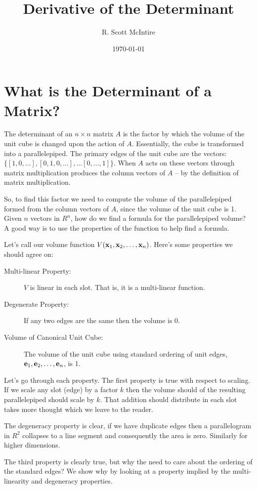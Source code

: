 \documentclass{article}
\title{Derivative of the Determinant}
\author{R. Scott McIntire}
\date{\today}
\begin{document}
\maketitle

\section{What is the Determinant of a Matrix?}
The determinant of an $n\times n$ matrix $A$ is the factor by which the volume of
the unit cube is changed upon the action of $A$. Essentially, the cube is
transformed into a parallelepiped. The primary edges of the unit cube are the
vectors: $\{ [1, 0, \ldots], [0, 1, 0, \ldots], \ldots [0, \dots, 1]\}$.
When $A$ acts on these vectors through matrix multiplication
produces the column vectors of $A$ -- by the definition of matrix multiplication.

So, to find this factor we need to compute the volume of the parallelepiped formed
from the column vectors of $A$, since the volume of the unit cube is 1.
Given $n$ vectors in $R^n$, how do we find a formula for the parallelepiped volume?
A good way is to use the properties of the function to help find a formula.

Let's call our volume function $V({\bf x}_1, {\bf x}_2, \ldots, {\bf x}_n)$.
Here's some properties we should agree on:
\begin{description}
\item[Multi-linear Property:]{$V$ is linear in each slot. That is,
    it is a multi-linear function.}
\item[Degenerate Property:]{If any two edges are the same then the volume is $0$.}
\item[Volume of Canonical Unit Cube:]{The volume of the unit cube using
    standard ordering of unit edges, ${\bf e}_1, {\bf e}_2, \ldots , {\bf e}_n$, is 1.}
\end{description}
Let's go through each property.
The first property is true with respect to scaling. If we scale any slot
(edge) by a factor
$k$ then the volume should of the resulting parallelepiped should scale by $k$.
That addition should distribute in each slot takes more thought which we leave
to the reader.

The degeneracy property is clear, if we have duplicate edges then a parallelogram
in $R^2$ collapses to a line segment and consequently the area is zero. Similarly
for higher dimensions.

The third property is clearly true, but why the need to care about the ordering
of the standard edges? We show why by looking at a property implied by the
multi-linearity and degeneracy properties.
    
\end{document}
